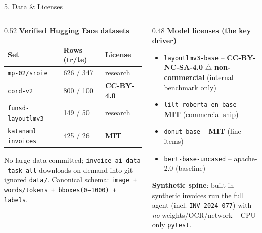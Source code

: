 \documentclass[10pt,aspectratio=169]{beamer}
\begin{document}
\begin{frame}{5. Data \& Licenses}
\begin{columns}[T]
\begin{column}{0.52\textwidth}
\textbf{Verified Hugging Face datasets}
\begin{table}[h]
\centering\scriptsize
\begin{tabular}{lll}
\toprule
\textbf{Set} & \textbf{Rows (tr/te)} & \textbf{License} \\
\midrule
\texttt{mp-02/sroie}        & 626 / 347 & research \\
\texttt{cord-v2}            & 800 / 100 & \textbf{CC-BY-4.0} \\
\texttt{funsd-layoutlmv3}   & 149 / 50  & research \\
\texttt{katanaml invoices}  & 425 / 26  & \textbf{MIT} \\
\bottomrule
\end{tabular}
\end{table}
\scriptsize No large data committed; \texttt{invoice-ai data --task all} downloads on demand into git-ignored \texttt{data/}. Canonical schema: \texttt{image + words/tokens + bboxes(0--1000) + labels}.
\end{column}
\begin{column}{0.48\textwidth}
\textbf{Model licenses (the key driver)}
\begin{itemize}\scriptsize
  \item \texttt{layoutlmv3-base} -- \textbf{CC-BY-NC-SA-4.0} $\triangle$ \textbf{non-commercial} (internal benchmark only)
  \item \texttt{lilt-roberta-en-base} -- \textbf{MIT} (commercial ship)
  \item \texttt{donut-base} -- \textbf{MIT} (line items)
  \item \texttt{bert-base-uncased} -- apache-2.0 (baseline)
\end{itemize}

\vspace{0.1cm}
\textbf{Synthetic spine}: built-in synthetic invoices run the full agent (incl. \texttt{INV-2024-077}) with \emph{no} weights/OCR/network -- CPU-only \texttt{pytest}.
\end{column}
\end{columns}
\end{frame}
\end{document}
